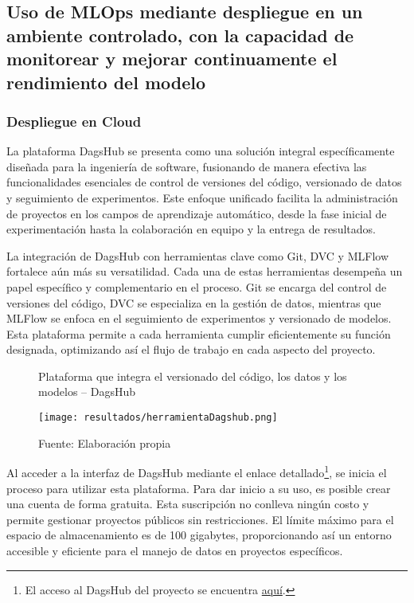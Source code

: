 \subsection{Uso de MLOps mediante despliegue en un ambiente controlado, con la capacidad de monitorear y mejorar continuamente el rendimiento del modelo}

\subsubsection{Despliegue en Cloud}

La plataforma DagsHub se presenta como una solución integral específicamente diseñada para la ingeniería de software, fusionando de manera efectiva las funcionalidades esenciales de control de versiones del código, versionado de datos y seguimiento de experimentos. Este enfoque unificado facilita la administración de proyectos en los campos de aprendizaje automático, desde la fase inicial de experimentación hasta la colaboración en equipo y la entrega de resultados. \newline

La integración de DagsHub con herramientas clave como Git, DVC y MLFlow fortalece aún más su versatilidad. Cada una de estas herramientas desempeña un papel específico y complementario en el proceso. Git se encarga del control de versiones del código, DVC se especializa en la gestión de datos, mientras que MLFlow se enfoca en el seguimiento de experimentos y versionado de modelos. Esta plataforma permite a cada herramienta cumplir eficientemente su función designada, optimizando así el flujo de trabajo en cada aspecto del proyecto.

\newpage

\begin{figure}[h]
\centering
\caption{Plataforma que integra el versionado del código, los datos y los modelos – DagsHub}
\texttt{[image: resultados/herramientaDagshub.png]}
\caption*{\footnotesize Fuente: Elaboración propia}
\label{fig:figuraHerramientaDagshub}
\end{figure}

Al acceder a la interfaz de DagsHub mediante el enlace detallado\footnote{El acceso al DagsHub del proyecto se encuentra \href{https://dagshub.com/juferoto/mlops_project}{aquí}.}, se inicia el proceso para utilizar esta plataforma. Para dar inicio a su uso, es posible crear una cuenta de forma gratuita. Esta suscripción no conlleva ningún costo y permite gestionar proyectos públicos sin restricciones. El límite máximo para el espacio de almacenamiento es de 100 gigabytes, proporcionando así un entorno accesible y eficiente para el manejo de datos en proyectos específicos.

